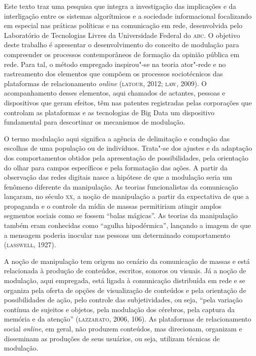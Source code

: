 
\noindent{}Este texto traz uma pesquisa que integra a investigação das implicações
e da interligação entre os sistemas algorítmicos e a sociedade
informacional focalizando em especial nas práticas políticas e na
comunicação em rede, desenvolvida pelo Laboratório de Tecnologias Livres
da Universidade Federal do \textsc{abc}. O objetivo deste trabalho é apresentar o
desenvolvimento do conceito de modulação para compreender os processos
contemporâneos de formação da opinião pública em rede. Para tal, o
método empregado inspirou"-se na teoria ator"-rede e no rastreamento dos
elementos que compõem os processos sociotécnicos das plataformas de
relacionamento \emph{online} (\textsc{latour}, 2012; \textsc{law}, 2009). O acompanhamento
desses elementos, aqui chamados de actantes, pessoas e dispositivos que
geram efeitos, têm nas patentes registradas pelas corporações que
controlam as plataformas e as tecnologias de Big Data um dispositivo
fundamental para descortinar os mecanismos de modulação.

O termo modulação aqui significa a agência de delimitação e condução das
escolhas de uma população ou de indivíduos. Trata"-se dos ajustes e da
adaptação dos comportamentos obtidos pela apresentação de
possibilidades, pela orientação do olhar para campos específicos e pela
formatação das ações. A partir da observação das redes digitais nasce a
hipótese de que a modulação seria um fenômeno diferente da manipulação.
As teorias funcionalistas da comunicação lançaram, no século \textsc{xx}, a noção
de manipulação a partir da expectativa de que a propaganda e o controle
da mídia de massas permitiriam atingir amplos segmentos sociais como se
fossem ``balas mágicas''. As teorias da manipulação também eram
conhecidas como ``agulha hipodérmica'', lançando a imagem de que a
mensagem poderia inocular nas pessoas um determinado comportamento
(\textsc{lasswell}, 1927).

A noção de manipulação tem origem no cenário da comunicação de massas e
está relacionada à produção de conteúdos, escritos, sonoros ou visuais.
Já a noção de modulação, aqui empregada, está ligada à comunicação
distribuída em rede e se organiza pela oferta de opções de visualização
de conteúdos e pela orientação de possibilidades de ação, pelo controle
das subjetividades, ou seja, ``pela variação contínua de sujeitos e
objetos, pela modulação dos cérebros, pela captura da memória e da
atenção'' (\textsc{lazzarato}, 2006, 106). As plataformas de relacionamento
social \emph{online}, em geral, não produzem conteúdos, mas direcionam,
organizam e disseminam as produções de seus usuários, ou seja, utilizam
técnicas de modulação.

